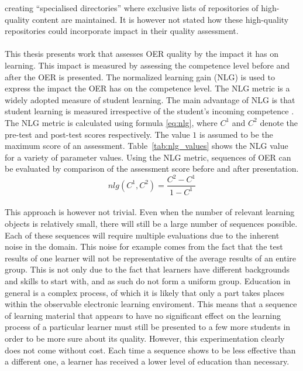 creating “specialised directories” where exclusive lists of repositories of
high-quality content are maintained. It is however not stated how these
high-quality repositories could incorporate impact in their quality
assessment.\\\\
\noindent
This thesis presents work that assesses OER quality by the impact it has on
learning. This impact is measured by assessing the competence level before and
after the OER is presented. The normalized learning gain (NLG) is used to express the
impact the OER has on the competence level. The NLG metric is a widely adopted
measure of student learning. The main advantage of NLG is that student learning
is measured irrespective of the student's incoming competence \citep{Chi2010}.
The NLG metric is calculated using formula \eqref{eq:nlg}, where $C^1$ and
$C^2$ denote the pre-test and post-test scores respectively. The value $1$ is
assumed to be the maximum score of an assessment. Table~\ref{tab:nlg_values}
shows the NLG value for a variety of parameter values. Using the NLG metric,
sequences of OER can be evaluated by comparison of the assessment score before
and after presentation.\\
\begin{equation}
	nlg(C^1, C^2) = \frac{C^2-C^1}{1-C^1}
	\label{eq:nlg}
\end{equation}\\
\noindent
This approach is however not
trivial. Even when the number of relevant learning objects is relatively small,
there will still be a large number of sequences possible. Each of these
sequences will require multiple evaluations due to the inherent noise in the
domain. This noise for example comes from the fact that the test results of one
learner will not be representative of the average results of an entire group.
This is not only due to the fact that learners have different backgrounds and
skills to start with, and as such do not form a uniform group. Education in
general is a complex process, of which it is likely that only a part takes
places within the observable electronic learning enviroment. This means that a
sequence of learning material that appears to have no significant effect on the
learning process of a particular learner must still be presented to a few more
students in order to be more sure about its quality. However, this
experimentation clearly does not come without cost. Each time a sequence shows
to be less effective than a different one, a learner has received a lower level
of education than necessary.\\
